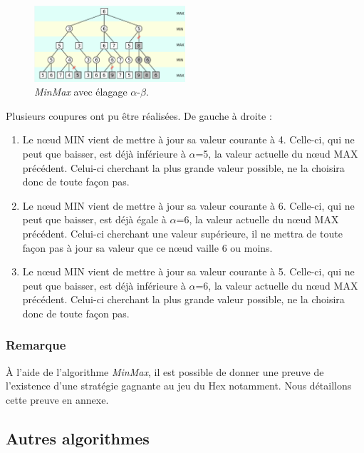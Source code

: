 \begin{figure}[h]
    \begin{center}
        \includegraphics[width=0.5\textwidth]{root/minmax_alpha_beta.png}
    \end{center}
    \caption{\emph{MinMax} avec élagage $\alpha$-$\beta$.}\label{fig:min_max_alpha_beta}
\end{figure}


Plusieurs coupures ont pu être réalisées. De gauche à droite :
\begin{enumerate}
    \item Le nœud MIN vient de mettre à jour sa valeur courante à 4. Celle-ci, qui ne peut que baisser, est déjà inférieure à $\alpha$=5, 
    la valeur actuelle du nœud MAX précédent. Celui-ci cherchant la plus grande valeur possible, ne la choisira donc de toute façon pas.
    \item Le nœud MIN vient de mettre à jour sa valeur courante à 6. Celle-ci, qui ne peut que baisser, est déjà égale à $\alpha$=6, la valeur 
    actuelle du nœud MAX précédent. Celui-ci cherchant une valeur supérieure, il ne mettra de toute façon pas à jour sa valeur que ce nœud 
    vaille 6 ou moins.
    \item Le nœud MIN vient de mettre à jour sa valeur courante à 5. Celle-ci, qui ne peut que baisser, est déjà inférieure à $\alpha$=6, la valeur 
    actuelle du nœud MAX précédent. Celui-ci cherchant la plus grande valeur possible, ne la choisira donc de toute façon pas.
\end{enumerate}

\subsubsection{Remarque}
À l'aide de l'algorithme \emph{MinMax}, il est possible de donner une preuve de l'existence d'une stratégie gagnante au jeu du Hex notamment. Nous détaillons
cette preuve en annexe.

\subsection{Autres algorithmes}
